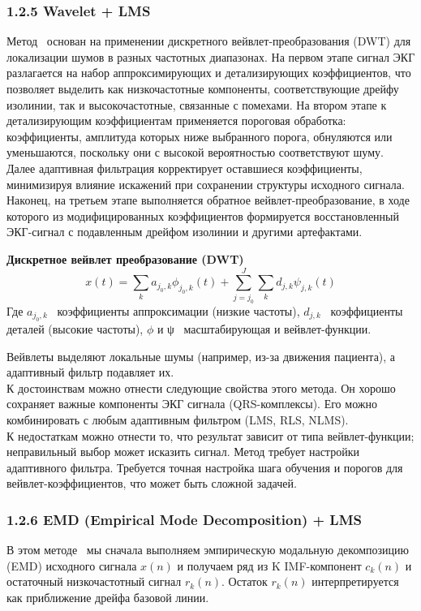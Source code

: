 \documentclass[10pt,a5paper]{article}
\numberwithin{figure}{section}
\numberwithin{table}{section}
\begin{document}
\subsubsection{1.2.5 Wavelet + LMS}
Метод~\cite{biswas2019} основан на применении дискретного вейвлет-преобразования (DWT) для локализации шумов в разных частотных диапазонах. На первом этапе сигнал ЭКГ разлагается на набор аппроксимирующих и детализирующих коэффициентов, что позволяет выделить как низкочастотные компоненты, соответствующие дрейфу изолинии, так и высокочастотные, связанные с помехами. На втором этапе к детализирующим коэффициентам применяется пороговая обработка: коэффициенты, амплитуда которых ниже выбранного порога, обнуляются или уменьшаются, поскольку они с высокой вероятностью соответствуют шуму. Далее адаптивная фильтрация корректирует оставшиеся коэффициенты, минимизируя влияние искажений при сохранении структуры исходного сигнала. Наконец, на третьем этапе выполняется обратное вейвлет-преобразование, в ходе которого из модифицированных коэффициентов формируется восстановленный ЭКГ-сигнал с подавленным дрейфом изолинии и другими артефактами.

\textbf{Дискретное вейвлет преобразование (DWT)}
\begin{equation*}
  x\left(t\right)=\sum_{k}{a_{j_0,k}\phi_{j_0,k}\left(t\right)}+\sum_{j=j_0}^{J}\sum_{k}{d_{j,k}\psi_{j,k}\left(t\right)}
\end{equation*}
\noindent
Где 	$a_{j_0,k}$ \textendash\ коэффициенты аппроксимации (низкие частоты), $d_{j,k}$ \textendash\ коэффициенты деталей (высокие частоты), $\phi$ и ψ \textendash\ масштабирующая и вейвлет-функции.

Вейвлеты выделяют локальные шумы (например, из-за движения пациента), а адаптивный фильтр подавляет их.\\
К достоинствам можно отнести следующие свойства этого метода.
Он хорошо сохраняет важные компоненты ЭКГ сигнала (QRS-комплексы).
Его можно комбинировать с любым адаптивным фильтром (LMS, RLS, NLMS).\\
К недостаткам можно отнести то, что результат зависит от типа вейвлет-функции; неправильный выбор может исказить сигнал. Метод требует настройки адаптивного фильтра. Требуется точная настройка шага обучения и порогов для вейвлет-коэффициентов, что может быть сложной задачей.

\subsubsection{1.2.6 EMD (Empirical Mode Decomposition) + LMS}
В этом методе~\cite{huang2015} мы сначала выполняем эмпирическую модальную декомпозицию (EMD) исходного сигнала $x(n)$ и получаем ряд из K IMF-компонент $c_k(n)$ и остаточный низкочастотный сигнал $r_k(n)$. Остаток $r_k(n)$ интерпретируется как приближение дрейфа базовой линии.
\end{document}
